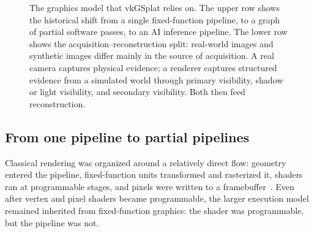 \documentclass[10pt,journal]{IEEEtran}
\begin{document}
\begin{figure}[t]
{%
}
\caption{The graphics model that vkGSplat relies on. The upper row shows
the historical shift from a single fixed-function pipeline, to a graph
of partial software passes, to an AI inference pipeline. The lower row
shows the acquisition--reconstruction split: real-world images and
synthetic images differ mainly in the source of acquisition. A real
camera captures physical evidence; a renderer captures structured
evidence from a simulated world through primary visibility, shadow or
light visibility, and secondary visibility. Both then feed
reconstruction.}
\label{fig:graphics-evolution}
\end{figure}

\subsection{From one pipeline to partial pipelines}

Classical rendering was organized around a relatively direct flow:
geometry entered the pipeline, fixed-function units transformed and
rasterized it, shaders ran at programmable stages, and pixels were
written to a framebuffer~\cite{akenine2018}. Even after vertex and
pixel shaders became programmable, the larger execution model remained
inherited from fixed-function graphics: the shader was programmable,
but the pipeline was not.
\end{document}
